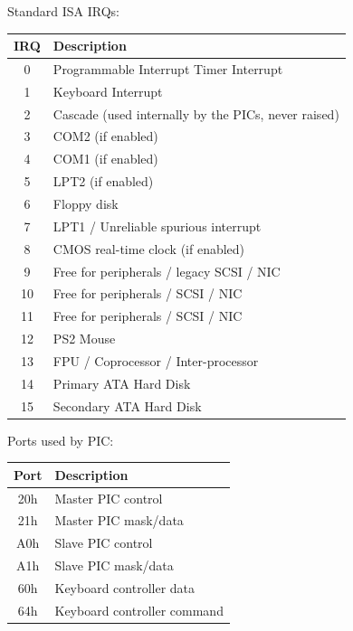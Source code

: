 \documentclass{article}
\newcommand{\layout}[1]{\parbox{\linewidth}{#1}}
\begin{document}
\layout{
  Standard ISA IRQs:
  \begin{table}[H]
    \centering
    \begin{tabular}{|c|l|}
      \hline \textbf{IRQ} & \textbf{Description} \\ \hline
      0 & Programmable Interrupt Timer Interrupt \\
      1 & Keyboard Interrupt \\
      2 & Cascade (used internally by the PICs, never raised) \\
      3 & COM2 (if enabled) \\
      4 & COM1 (if enabled) \\
      5 & LPT2 (if enabled) \\
      6 & Floppy disk \\
      7 & LPT1 / Unreliable spurious interrupt \\
      8 & CMOS real-time clock (if enabled) \\
      9 & Free for peripherals / legacy SCSI / NIC \\
      10 & Free for peripherals / SCSI / NIC \\
      11 & Free for peripherals / SCSI / NIC \\
      12 & PS2 Mouse \\
      13 & FPU / Coprocessor / Inter-processor \\
      14 & Primary ATA Hard Disk \\
      15 & Secondary ATA Hard Disk \\ \hline
    \end{tabular}
  \end{table}
}

\layout{
  Ports used by PIC:
  \begin{table}[H]
    \centering
    \begin{tabular}{|c|l|}
      \hline \textbf{Port} & \textbf{Description} \\ \hline
      20h & Master PIC control \\
      21h & Master PIC mask/data \\
      A0h & Slave PIC control \\
      A1h & Slave PIC mask/data \\
      60h & Keyboard controller data \\
      64h & Keyboard controller command \\ \hline
    \end{tabular}
  \end{table}
}
\end{document}
